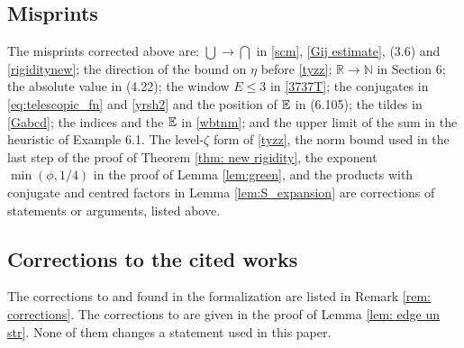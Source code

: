 \subsection*{Misprints}
The misprints corrected above are: $\bigcup\to\bigcap$ in \eqref{scm}, \eqref{Gij estimate}, (3.6) and \eqref{rigiditynew}; the direction of the bound on $\eta$ before \eqref{tyzz}; $\mathbb R\to\mathbb N$ in Section 6; the absolute value in (4.22); the window $E\le3$ in \eqref{3737T}; the conjugates in \eqref{eq:telescopic_fn} and \eqref{yrsh2} and the position of $\mathbb{E}$ in (6.105); the tildes in \eqref{Gabcd}; the indices and the $\mathbb{E}$ in \eqref{wbtnm}; and the upper limit of the sum in the heuristic of Example 6.1. The level-$\zeta$ form of \eqref{tyzz}, the norm bound used in the last step of the proof of Theorem \ref{thm: new rigidity}, the exponent $\min(\phi,1/4)$ in the proof of Lemma \ref{lem:green}, and the products with conjugate and centred factors in Lemma \ref{lem:S_expansion} are corrections of statements or arguments, listed above.

\subsection*{Corrections to the cited works}
The corrections to \cite{EKYY1} and \cite{EKYY2} found in the formalization are listed in Remark \ref{rem: corrections}. The corrections to \cite{EYY} are given in the proof of Lemma \ref{lem: edge un str}. None of them changes a statement used in this paper.
\endgroup
